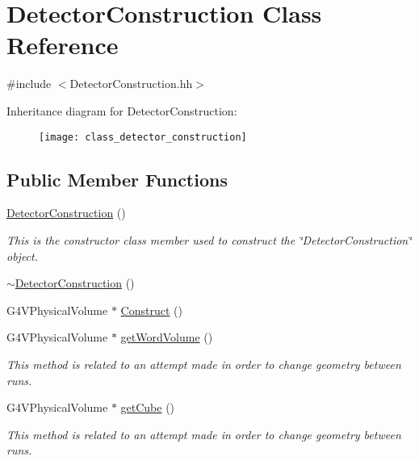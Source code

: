 \hypertarget{class_detector_construction}{\section{Detector\-Construction Class Reference}
\label{class_detector_construction}
}


{\ttfamily \#include $<$Detector\-Construction.\-hh$>$}

Inheritance diagram for Detector\-Construction\-:\begin{figure}[H]
\begin{center}
\leavevmode
\texttt{[image: class\_detector\_construction]}
\end{center}
\end{figure}
\subsection*{Public Member Functions}
\begin{DoxyCompactItemize}
\item 
\hyperlink{class_detector_construction_a1533c4308baddd0b2dcdf40f61dea1ef}{Detector\-Construction} ()
\begin{DoxyCompactList}\small\item\em This is the constructor class member used to construct the \char`\"{}\-Detector\-Construction\char`\"{} object. \end{DoxyCompactList}\item 
\hyperlink{class_detector_construction_a73013cab35a2b470338da2e4686edea3}{$\sim$\-Detector\-Construction} ()
\item 
G4\-V\-Physical\-Volume $\ast$ \hyperlink{class_detector_construction_a662c618480b345a747f014b845d5ffdf}{Construct} ()
\item 
G4\-V\-Physical\-Volume $\ast$ \hyperlink{class_detector_construction_ab3d0fbcccb1be35f505a78e7fd4ffce2}{get\-Word\-Volume} ()
\begin{DoxyCompactList}\small\item\em This method is related to an attempt made in order to change geometry between runs. \end{DoxyCompactList}\item 
G4\-V\-Physical\-Volume $\ast$ \hyperlink{class_detector_construction_af45ab5e73219e233c7c015573cf4f88f}{get\-Cube} ()
\begin{DoxyCompactList}\small\item\em This method is related to an attempt made in order to change geometry between runs. \end{DoxyCompactList}\end{DoxyCompactItemize}


